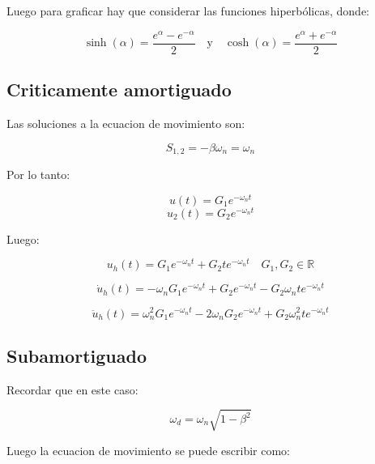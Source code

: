 \documentclass{article}  %
\begin{document}
Luego para graficar hay que considerar las funciones hiperbólicas, donde:

\begin{equation}
    \sinh(\alpha) = \frac{e^{\alpha} - e^{-\alpha}}{2} \quad \text{y} \quad \cosh(\alpha) = \frac{e^{\alpha} + e^{-\alpha}}{2}
\end{equation}


\subsection{Criticamente amortiguado}

Las soluciones a la ecuacion de movimiento son:

\begin{equation}
   S_{1,2} = -\beta \omega_n = \omega_n
\end{equation}

Por lo tanto:

\begin{equation}
    u(t) = G_1e^{-\omega_n t} 
\end{equation}
\begin{equation}
    u_2(t) = G_2e^{-\omega_n t}
\end{equation}

Luego:

\begin{equation}
    u_h(t) = G_1e^{-\omega_n t} + G_2te^{-\omega_n t} \quad G_1, G_2 \in \mathbb{R}
\end{equation}

\begin{equation}
    \dot{u}_h(t) = -\omega_n G_1e^{-\omega_n t} + G_2e^{-\omega_n t} - G_2\omega_n te^{-\omega_n t}
\end{equation}

\begin{equation}
    \ddot{u}_h(t) = \omega_n^2 G_1e^{-\omega_n t} - 2\omega_n G_2e^{-\omega_n t} + G_2\omega_n^2 te^{-\omega_n t}
\end{equation}

\subsection{Subamortiguado}

Recordar que en este caso:

\begin{equation}
    \omega_d = \omega_n \sqrt{1 - \beta^2}
\end{equation}

Luego la ecuacion de movimiento se puede escribir como:
\end{document}
